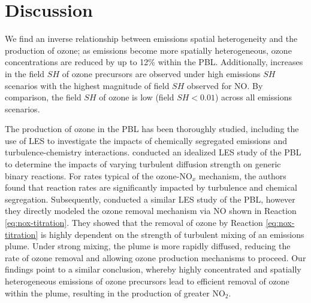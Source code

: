 \section{Discussion}

We find an inverse relationship between emissions spatial heterogeneity and the production of ozone; as emissions become more spatially heterogeneous, ozone concentrations are reduced by up to 12\% within the PBL. Additionally, increases in the field $SH$ of ozone precursors are observed under high emissions $SH$ scenarios with the highest magnitude of field $SH$ observed for NO. By comparison, the field $SH$ of ozone is low (field $SH<0.01$) across all emissions scenarios. 


The production of ozone in the PBL has been thoroughly studied, including the use of LES to investigate the impacts of chemically segregated emissions and turbulence-chemistry interactions. \cite{schumann_large-eddy_1989} conducted an idealized LES study of the PBL to determine the impacts of varying turbulent diffusion strength on generic binary reactions. For rates typical of the ozone-NO$_x$ mechanism, the authors found that reaction rates are significantly impacted by turbulence and chemical segregation. Subsequently, \cite{sykes_large-eddy_1992} conducted a similar LES study of the PBL, however they directly modeled the ozone removal mechanism via NO shown in Reaction \ref{eq:nox-titration}. They showed that the removal of ozone by Reaction \ref{eq:nox-titration} is highly dependent on the strength of turbulent mixing of an emissions plume. Under strong mixing, the plume is more rapidly diffused, reducing the rate of ozone removal and allowing ozone production mechanisms to proceed. Our findings point to a similar conclusion, whereby highly concentrated and spatially heterogeneous emissions of ozone precursors lead to efficient removal of ozone within the plume, resulting in the production of greater NO$_2$. 

